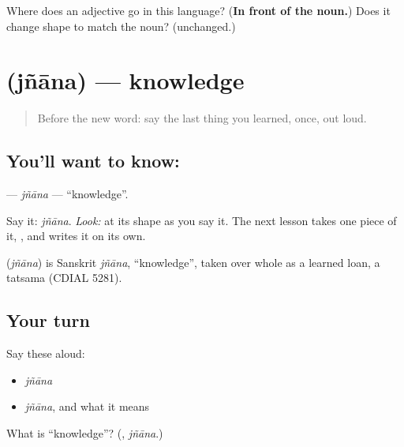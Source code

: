 \begin{tcolorbox}[breakable,colback=teal!4,colframe=teal!35!black,title={Before you move on}]
Where does an adjective go in this language? (\textbf{In front of the noun.}) Does it change shape to match the noun? (unchanged.)
\end{tcolorbox}
\section[\texorpdfstring{\kn{ಜ್ಞಾನ} (jñāna)}{ಜ್ಞಾನ (jñāna)}]{ (jñāna) — knowledge}

\label{lesson:KA-C42-jnaana}



\begin{quote}
Before the new word: say the last thing you learned, once, out loud.
\end{quote}

\subsection*{You'll want to know: }
\textbf{} — \emph{jñāna} — \textquotedblleft{}knowledge\textquotedblright{}.

Say it: \emph{jñāna}. \emph{Look:} at its shape as you say it. The next lesson takes one piece of it, \textbf{}, and writes it on its own.

\begin{cousinweb}
\textbf{} (\emph{jñāna}) is Sanskrit \emph{jñāna}, \textquotedblleft{}knowledge\textquotedblright{}, taken over whole as a learned loan, a tatsama (CDIAL 5281).
\end{cousinweb}

\subsection*{Your turn}
Say these aloud:

\begin{itemize}
\raggedright
  \item \emph{jñāna}
  \item \emph{jñāna}, and what it means
\end{itemize}

\begin{tcolorbox}[breakable,colback=teal!4,colframe=teal!35!black,title={Before you move on}]
What is \textquotedblleft{}knowledge\textquotedblright{}? (\textbf{}, \emph{jñāna}.)
\end{tcolorbox}
